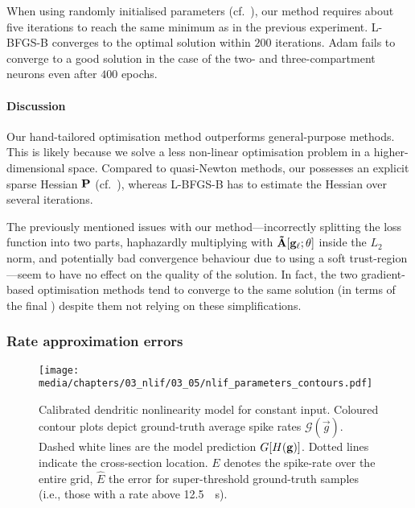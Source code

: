 When using randomly initialised parameters (cf.~), our method requires about five iterations to reach the same minimum as in the previous experiment.
L-BFGS-B converges to the optimal solution within $200$ iterations.
Adam fails to converge to a good solution in the case of the two- and three-compartment neurons even after $400$ epochs.

\paragraph{Discussion}
Our hand-tailored optimisation method outperforms general-purpose methods.
This is likely because we solve a less non-linear optimisation problem in a higher-dimensional space.
Compared to quasi-Newton methods, our \QP possesses an explicit sparse Hessian $\mathbf{P}$ (cf.~), whereas L-BFGS-B has to estimate the Hessian over several iterations.

The previously mentioned issues with our method---incorrectly splitting the loss function into two parts, haphazardly multiplying with $\mathbf{\tilde A}[\mathbf{g}_\ell; \mathbf{\theta}]$ inside the $L_2$ norm, and potentially bad convergence behaviour due to using a soft trust-region---seem to have no effect on the quality of the solution.
In fact, the two gradient-based optimisation methods tend to converge to the same solution (in terms of the final \NRMSE) despite them not relying on these simplifications.

\subsubsection{Rate approximation errors}

\begin{figure}[t]
	\texttt{[image: media/chapters/03\_nlif/03\_05/nlif\_parameters\_contours.pdf]}
	\caption[Calibrated $n$-LIF dendritic nonlinearity model for constant input]{
		Calibrated \nlif dendritic nonlinearity model for constant input.
		Coloured contour plots depict ground-truth average spike rates $\mathscr{G}(\vec g)$.
		Dashed white lines are the model prediction $G[{H}(\mathbf{g})]$. Dotted lines indicate the cross-section location.
		$E$ denotes the spike-rate \RMSE over the entire grid, $\hat E$ the error for super-threshold ground-truth samples (i.e., those with a rate above \SI{12.5}{\per\second}).
	}
	\label{fig:nlif_parameters_contours}
\end{figure}

